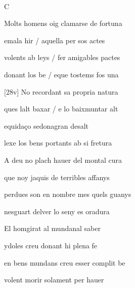 \documentclass[12pt]{article}
\renewcommand{\espaiAbansEtiquetaPoema}{\vspace{0ex}}
\begin{document}
\begin{estrofa}

\espaiAbansEtiquetaPoema

\\

\begin{rubrica}

C

\end{rubrica}

\end{estrofa}


\begin{estrofa}

 Molts homens oig clamarse de fortuna

 emala hir / aquella per sos actes

 volents ab leys / fer amigables pactes

 donant los be / eque tostems fos una

 [28v] No recordant sa propria natura

 ques lalt baxar / e lo baixmuntar alt

 equida\c{c}o sedonagran desalt

 lexe los bens portants ab si fretura

\end{estrofa}



\begin{estrofa}

 A deu no plach hauer del montal cura

 que noy jaquis de terribles affanys

 perdues son en nombre mes quels guanys

 nesguart delver lo seny es oradura

 El homgirat al mundanal saber

 ydoles creu donant hi plena fe

 en bens mundans creu esser complit be

 volent morir solament per hauer

\end{estrofa}
\end{document}
